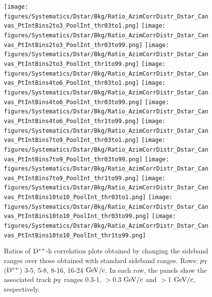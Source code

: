 \begin{figure}
\centering
{\texttt{[image: figures/Systematics/Dstar/Bkg/Ratio\_AzimCorrDistr\_Dstar\_Canvas\_PtIntBins2to3\_PoolInt\_thr03to1.png]}}
{\texttt{[image: figures/Systematics/Dstar/Bkg/Ratio\_AzimCorrDistr\_Dstar\_Canvas\_PtIntBins2to3\_PoolInt\_thr03to99.png]}}
{\texttt{[image: figures/Systematics/Dstar/Bkg/Ratio\_AzimCorrDistr\_Dstar\_Canvas\_PtIntBins2to3\_PoolInt\_thr1to99.png]}}
{\texttt{[image: figures/Systematics/Dstar/Bkg/Ratio\_AzimCorrDistr\_Dstar\_Canvas\_PtIntBins4to6\_PoolInt\_thr03to1.png]}}
{\texttt{[image: figures/Systematics/Dstar/Bkg/Ratio\_AzimCorrDistr\_Dstar\_Canvas\_PtIntBins4to6\_PoolInt\_thr03to99.png]}}
{\texttt{[image: figures/Systematics/Dstar/Bkg/Ratio\_AzimCorrDistr\_Dstar\_Canvas\_PtIntBins4to6\_PoolInt\_thr1to99.png]}}
{\texttt{[image: figures/Systematics/Dstar/Bkg/Ratio\_AzimCorrDistr\_Dstar\_Canvas\_PtIntBins7to9\_PoolInt\_thr03to1.png]}}
{\texttt{[image: figures/Systematics/Dstar/Bkg/Ratio\_AzimCorrDistr\_Dstar\_Canvas\_PtIntBins7to9\_PoolInt\_thr03to99.png]}}
{\texttt{[image: figures/Systematics/Dstar/Bkg/Ratio\_AzimCorrDistr\_Dstar\_Canvas\_PtIntBins7to9\_PoolInt\_thr1to99.png]}}
{\texttt{[image: figures/Systematics/Dstar/Bkg/Ratio\_AzimCorrDistr\_Dstar\_Canvas\_PtIntBins10to10\_PoolInt\_thr03to1.png]}}
{\texttt{[image: figures/Systematics/Dstar/Bkg/Ratio\_AzimCorrDistr\_Dstar\_Canvas\_PtIntBins10to10\_PoolInt\_thr03to99.png]}}
{\texttt{[image: figures/Systematics/Dstar/Bkg/Ratio\_AzimCorrDistr\_Dstar\_Canvas\_PtIntBins10to10\_PoolInt\_thr1to99.png]}}

 \caption{Ratios of ${\rm D^{*+}}$-h correlation plots obtained by changing the sideband ranges over those obtained with standard sideband ranges. Rows: $p_{\rm T}$(${\rm D^{*+}}$) 3-5, 5-8, 8-16, 16-24 $\mathrm{GeV}/c$. In each row, the panels show the associated track $p_{\rm T}$ ranges 0.3-1, $>$0.3 $\mathrm{GeV}/c$ and $>$1 $\mathrm{GeV}/c$, respectively.}
\label{fig:Syst_DstarBkg}
\end{figure}

